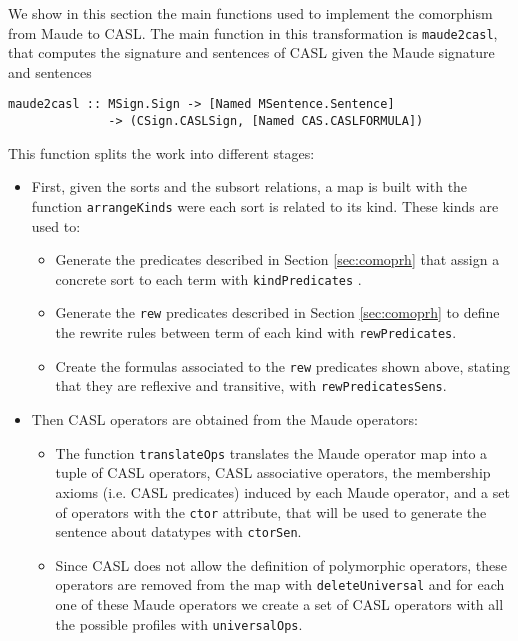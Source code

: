 
We show in this section the main functions used to implement the comorphism
from Maude to CASL. The main function in this transformation is
\verb"maude2casl", that computes the signature and sentences of CASL
given the Maude signature and sentences

{\codesize
\begin{verbatim}
maude2casl :: MSign.Sign -> [Named MSentence.Sentence]
              -> (CSign.CASLSign, [Named CAS.CASLFORMULA])
\end{verbatim}
}

This function splits the work into different stages:

\begin{itemize}
\item First, given the sorts and the subsort relations, a map is built
with the function \verb"arrangeKinds" were each sort is related to its
kind. These kinds are used to:

\begin{itemize}
\item Generate the predicates described in Section \ref{sec:comoprh}
that assign a concrete sort to each term with \verb"kindPredicates" .
\item Generate the \verb"rew" predicates described in Section
\ref{sec:comoprh} to define the rewrite rules between term of each
kind with \verb"rewPredicates".
\item Create the formulas associated to the \verb"rew" predicates
shown above, stating that they are reflexive and transitive, with
\verb"rewPredicatesSens".
\end{itemize}

\item Then CASL operators are obtained from the Maude operators:

\begin{itemize}
\item The function \verb"translateOps" translates the Maude operator map
into a tuple of CASL operators, CASL associative operators,
the membership axioms (i.e. CASL predicates) induced by each Maude operator,
and a set of operators with the \verb"ctor" attribute, that will be
used to generate the sentence about datatypes with \verb"ctorSen".
\item Since CASL does not allow the definition
of polymorphic operators, these operators are removed from the map
with \verb"deleteUniversal" and for each one of these Maude operators we
create a set of CASL operators with all the possible profiles with
\verb"universalOps".
\end{itemize}


\end{itemize}
